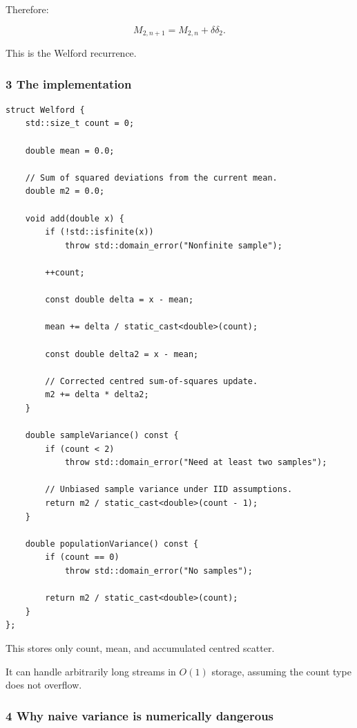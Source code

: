Therefore:

\[
 \boxed{ M_{2,n+1} = M_{2,n}+\delta\delta_2 }.
\]

This is the Welford recurrence.

\subsubsection{3 The implementation}\label{02-foundations-ii-ch030-the-implementation}

\hypertarget{02-foundations-ii-ch030-the-implementation}{}

\begin{verbatim}
struct Welford {
    std::size_t count = 0;

    double mean = 0.0;

    // Sum of squared deviations from the current mean.
    double m2 = 0.0;

    void add(double x) {
        if (!std::isfinite(x))
            throw std::domain_error("Nonfinite sample");

        ++count;

        const double delta = x - mean;

        mean += delta / static_cast<double>(count);

        const double delta2 = x - mean;

        // Corrected centred sum-of-squares update.
        m2 += delta * delta2;
    }

    double sampleVariance() const {
        if (count < 2)
            throw std::domain_error("Need at least two samples");

        // Unbiased sample variance under IID assumptions.
        return m2 / static_cast<double>(count - 1);
    }

    double populationVariance() const {
        if (count == 0)
            throw std::domain_error("No samples");

        return m2 / static_cast<double>(count);
    }
};
\end{verbatim}

This stores only count, mean, and accumulated centred scatter.

It can handle arbitrarily long streams in \(O(1)\) storage, assuming the count type does not overflow.

\subsubsection{4 Why naive variance is numerically dangerous}\label{02-foundations-ii-ch030-why-naive-variance-is-numerically-dangerous}

